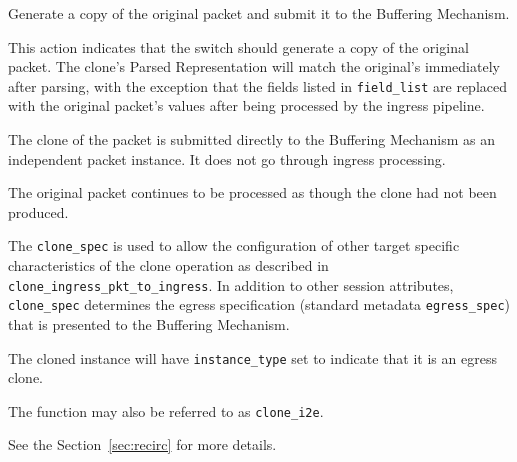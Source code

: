 \documentclass[12pt]{article}
\begin{document}
{ %
Generate a copy of the original packet and submit it to the Buffering Mechanism.
}
{ %
}
{ %
This action indicates that the switch should generate a copy of the original 
packet. The clone's Parsed Representation will match the original's immediately 
after parsing, with the exception that the fields listed in \texttt{field_list} are 
replaced with the original packet's values after being processed by the 
ingress pipeline.

The clone of the packet is submitted directly to the Buffering Mechanism as 
an independent packet instance. It does not go through ingress \matchaction 
processing.

The original packet continues to be processed as though the clone had not 
been produced.

The \texttt{clone_spec} is used to allow the configuration of other target specific 
characteristics of the clone operation as described in \texttt{clone_ingress_pkt_to_ingress}. 
In addition to other session attributes, \texttt{clone_spec} determines the egress 
specification (standard metadata \texttt{egress_spec}) that is presented to the 
Buffering Mechanism.

The cloned instance will have \texttt{instance_type} set to indicate that it is an 
egress clone. 

The function may also be referred to as \texttt{clone_i2e}.

See the Section~\ref{sec:recirc} for more details.

}

\end{document}
